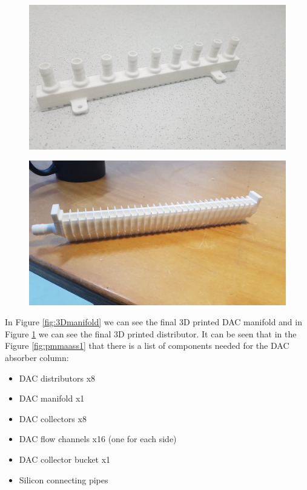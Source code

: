 \begin{figure}[H]
\centering
\begin{minipage}{.5\textwidth}
  \centering
  \includegraphics[width=0.9\linewidth]{images/mywork/Sprint1/Manifold.jpg}
  \label{fig:3Dmanifold}
\end{minipage}%
\begin{minipage}{.5\textwidth}
  \centering
  \includegraphics[width=0.9\linewidth]{images/mywork/Sprint1/Distributor.jpg}
  \label{fig:3Ddistributor}
\end{minipage}
\end{figure}

In Figure \ref{fig:3Dmanifold} we can see the final 3D printed DAC manifold and in Figure \ref{fig:3Ddistributor} we can see the final 3D printed distributor. It can be seen that in the Figure \ref{fig:pmmaass1} that there is a list of components needed for the DAC absorber column: 
\begin{itemize}
    \item DAC distributors x8 
    \item DAC manifold x1 
    \item DAC collectors x8 
    \item DAC flow channels x16 (one for each side)
    \item DAC collector bucket x1 
    \item Silicon connecting pipes
\end{itemize}


